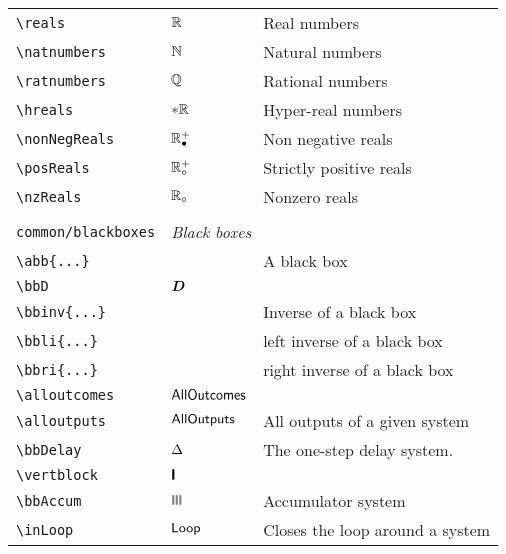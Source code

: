 \begin{longtable}{lll}
 \hline
{\color[rgb]{0.5,0.5,0.5}\texttt{\textbackslash reals}} & $\mathbb{R}$ &  Real numbers\\ 
 {\color[rgb]{0.5,0.5,0.5}\texttt{\textbackslash natnumbers}} & $\mathbb{N}$ &  Natural numbers\\ 
 {\color[rgb]{0.5,0.5,0.5}\texttt{\textbackslash ratnumbers}} & $\mathbb{Q}$ &  Rational numbers\\ 
 {\color[rgb]{0.5,0.5,0.5}\texttt{\textbackslash hreals}} & $\ast\mathbb{R}$ &  Hyper-real numbers\\ 
 {\color[rgb]{0.5,0.5,0.5}\texttt{\textbackslash nonNegReals}} & $\mathbb{R}^{+}_{\bullet}$ &  Non negative reals \\ 
 {\color[rgb]{0.5,0.5,0.5}\texttt{\textbackslash posReals}} & $\mathbb{R}^{+}_{\circ}$ &  Strictly positive reals\\ 
 {\color[rgb]{0.5,0.5,0.5}\texttt{\textbackslash nzReals}} & $\mathbb{R}_{\circ}$ &  Nonzero reals\\ 
  &  & \\ 
 {\color[rgb]{0.5,0.5,0.5}\texttt{common/blackboxes}} & \multicolumn{2}{l}{\emph{Black boxes}}\\ 
 \hline
{\color[rgb]{0.5,0.5,0.5}\texttt{\textbackslash abb\{...\}}} &  &  A black box\\ 
 {\color[rgb]{0.5,0.5,0.5}\texttt{\textbackslash bbD}} & $\boldsymbol{D}$ & \\ 
 {\color[rgb]{0.5,0.5,0.5}\texttt{\textbackslash bbinv\{...\}}} &  &  Inverse of a black box\\ 
 {\color[rgb]{0.5,0.5,0.5}\texttt{\textbackslash bbli\{...\}}} &  &  left inverse of a black box\\ 
 {\color[rgb]{0.5,0.5,0.5}\texttt{\textbackslash bbri\{...\}}} &  &  right inverse of a black box\\ 
 {\color[rgb]{0.5,0.5,0.5}\texttt{\textbackslash alloutcomes}} & $\mathsf{AllOutcomes}$ & \\ 
 {\color[rgb]{0.5,0.5,0.5}\texttt{\textbackslash alloutputs}} & $\mathsf{AllOutputs}$ &  All outputs of a given system\\ 
 {\color[rgb]{0.5,0.5,0.5}\texttt{\textbackslash bbDelay}} & $\Delta$ &  The one-step delay system.\\ 
 {\color[rgb]{0.5,0.5,0.5}\texttt{\textbackslash vertblock}} & $\vertblock$ & \\ 
 {\color[rgb]{0.5,0.5,0.5}\texttt{\textbackslash bbAccum}} & $\bbAccum$ &  Accumulator system\\ 
 {\color[rgb]{0.5,0.5,0.5}\texttt{\textbackslash inLoop}} & $\mathsf{Loop}$ &  Closes the loop around a system\\ 

\end{longtable}
